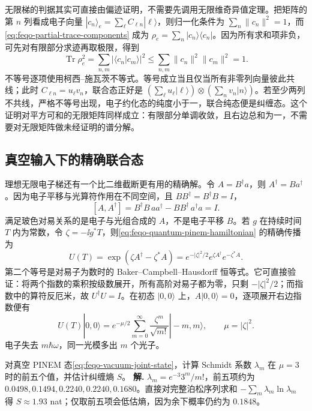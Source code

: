 无限梯的判据其实可直接由偏迹证明，不需要先调用无限维奇异值定理。把矩阵的第 \(n\) 列看成电子向量 \(|c_n\rangle_e=\sum_\ell C_{\ell n}|\ell\rangle\)，则归一化条件为 \(\sum_n\|c_n\|^2=1\)，而\cref{eq:feqo-partial-trace-components} 成为 \(\rho_e=\sum_n|c_n\rangle\langle c_n|\)。因为所有求和项非负，可先对有限部分求迹再取极限，得到
\begin{equation}
\operatorname{Tr}\rho_e^2
=\sum_{n,m}|\langle c_n|c_m\rangle|^2
\leq\sum_{n,m}\|c_n\|^2\|c_m\|^2=1.
\label{eq:feqo-entanglement-column-test}
\end{equation}
不等号逐项使用柯西--施瓦茨不等式。等号成立当且仅当所有非零列向量彼此共线；此时 \(C_{\ell n}=u_\ell v_n\)，联合态正好是 \((\sum_\ell u_\ell|\ell\rangle)\otimes(\sum_n v_n|n\rangle)\)。若至少两列不共线，严格不等号出现，电子约化态的纯度小于一，联合纯态便是纠缠态。这个证明对平方可和的无限矩阵同样成立：有限部分单调收敛，且右边总和为一，不需要对无限矩阵做未经证明的谱分解。

\subsection{真空输入下的精确联合态}

理想无限电子梯还有一个比二维截断更有用的精确解。令 \(A=B^\dagger a\)，则 \(A^\dagger=Ba^\dagger\)。因为电子平移与光算符作用在不同空间，且 \(BB^\dagger=B^\dagger B=I\)，
\[
[A,A^\dagger]=B^\dagger B\,aa^\dagger-BB^\dagger\,a^\dagger a=I.
\]
满足玻色对易关系的是电子与光组合成的 \(A\)，不是电子平移 \(B\)。若 \(g\) 在持续时间 \(T\) 内为常数，令 \(\zeta=-\ii g^*T\)，则\cref{eq:feqo-quantum-pinem-hamiltonian} 的精确传播为
\begin{equation}
U(T)=\exp(\zeta A^\dagger-\zeta^*A)
=e^{-|\zeta|^2/2}e^{\zeta A^\dagger}e^{-\zeta^*A}.
\label{eq:feqo-joint-displacement}
\end{equation}
第二个等号是对易子为数时的 Baker--Campbell--Hausdorff 恒等式。它可直接验证：将两个指数的乘积按级数展开，所有高阶对易子都为零，只剩 \(-|\zeta|^2/2\)；而指数中的算符反厄米，故 \(U^\dagger U=I\)。在初态 \(|0,0\rangle\) 上，\(A|0,0\rangle=0\)，逐项展开右边指数便有
\begin{equation}
U(T)|0,0\rangle=e^{-\mu/2}\sum_{m=0}^\infty
\frac{\zeta^m}{\sqrt{m!}}|-m,m\rangle,
\qquad \mu=|\zeta|^2.
\label{eq:feqo-vacuum-joint-state}
\end{equation}
电子失去 \(m\hbar\omega\)，同一光模多出 \(m\) 个光子。


\par
\begin{workedexample}
对真空 PINEM 态\cref{eq:feqo-vacuum-joint-state}，计算 Schmidt 系数 \(\lambda_m\) 在 \(\mu=3\) 时的前五个值，并估计纠缠熵 \(S\)。
\textbf{解.} \(\lambda_m=e^{-3}3^m/m!\)，前五项约为 \(0.0498,0.1494,0.2240,0.2240,0.1680\)。直接对完整泊松序列求和 \(-\sum_m\lambda_m\ln\lambda_m\) 得 \(S\approx1.93\) nat；仅取前五项会低估熵，因为余下概率仍约为 \(0.1848\)。
\end{workedexample}
\par

